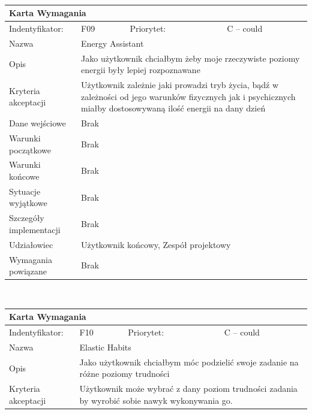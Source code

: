 \documentclass[a4paper,11pt]{report}
\begin{document}
\begin{itemize}
\begin{itemize}
\begin{tabular}{|p{3cm}|p{2cm}|p{2cm}|p{6cm}|}
		\hline
		\end{tabular}\\
		\begin{tabular}{|p{3cm}|p{2cm}|p{2cm}|p{6cm}|}
		\hline
		\multicolumn{4}{|p{12 cm}|}{Karta Wymagania}\\
		\hline
		Indentyfikator: & F09 & Priorytet: & C – could\\
		\hline
		Nazwa & \multicolumn{3}{|p{10 cm}|}{Energy Assistant}\\
		\hline
		Opis & \multicolumn{3}{|p{10 cm}|}{Jako użytkownik chciałbym żeby moje rzeczywiste poziomy energii były lepiej rozpoznawane }\\
		\hline
		Kryteria akceptacji & \multicolumn{3}{|p{10 cm}|}{Użytkownik zależnie jaki prowadzi tryb życia, bądź w zależności od jego warunków fizycznych jak i psychicznych miałby dostosowywaną ilość energii na dany dzień}\\
		\hline
		Dane wejściowe & \multicolumn{3}{|p{10 cm}|}{Brak}\\
		\hline
		Warunki początkowe & \multicolumn{3}{|p{10 cm}|}{Brak}\\
		\hline
		Warunki końcowe & \multicolumn{3}{|p{10 cm}|}{Brak}\\
		\hline
		Sytuacje wyjątkowe & \multicolumn{3}{|p{10 cm}|}{Brak}\\
		\hline
		Szczegóły implementacji & \multicolumn{3}{|p{10 cm}|}{Brak}\\
		\hline
		Udziałowiec & \multicolumn{3}{|p{10 cm}|}{Użytkownik końcowy, Zespół projektowy}\\
		\hline
		Wymagania powiązane & \multicolumn{3}{|p{10 cm}|}{Brak}\\
		\hline
		\end{tabular}\\
		\begin{tabular}{|p{3cm}|p{2cm}|p{2cm}|p{6cm}|}
		\hline
		\multicolumn{4}{|p{12 cm}|}{Karta Wymagania}\\
		\hline
		Indentyfikator: & F10 & Priorytet: & C – could\\
		\hline
		Nazwa & \multicolumn{3}{|p{10 cm}|}{Elastic Habits}\\
		\hline
		Opis & \multicolumn{3}{|p{10 cm}|}{Jako użytkownik chciałbym móc podzielić swoje zadanie na różne poziomy trudności }\\
		\hline
		Kryteria akceptacji & \multicolumn{3}{|p{10 cm}|}{Użytkownik może wybrać z dany poziom trudności zadania by wyrobić sobie nawyk wykonywania go.}\\
		\hline

\end{tabular}
\end{itemize}
\end{itemize}
\end{document}
